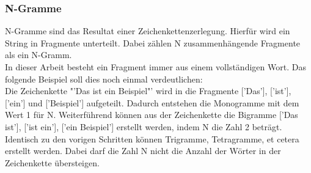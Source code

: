 		\subsubsection{N-Gramme}
			N-Gramme sind das Resultat einer Zeichenkettenzerlegung. Hierfür wird ein String in Fragmente unterteilt. Dabei zählen N zusammenhängende Fragmente als ein N-Gramm. \cite{cavnar1994n}\\
			In dieser Arbeit besteht ein Fragment immer aus einem vollständigen Wort. Das folgende Beispiel soll dies noch einmal verdeutlichen:\\
			Die Zeichenkette "'Das ist ein Beispiel"' wird in die Fragmente ['Das'], ['ist'], ['ein'] und ['Beispiel'] aufgeteilt. Dadurch entstehen die Monogramme mit dem Wert 1 für N. Weiterführend können aus der Zeichenkette die Bigramme ['Das ist'], ['ist ein'], ['ein Beispiel'] erstellt werden, indem N die Zahl 2 beträgt. Identisch zu den vorigen Schritten können Trigramme, Tetragramme, et cetera erstellt werden. Dabei darf die Zahl N nicht die Anzahl der Wörter in der Zeichenkette übersteigen.


